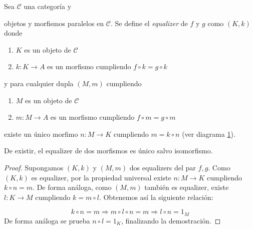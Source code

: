 \begin{definicion} [Equalizer]
    Sea $\mathscr{C}$ una categoría y  objetos y morfismos paralelos en $\mathscr{C}$. Se define el \textit{equalizer} de $f$ y $g$ como $(K,k)$ donde
    \begin{enumerate}
        \item $K$ es un objeto de $\mathscr{C}$
        \item $k: K \longrightarrow A$ es un morfismo cumpliendo $f \circ k = g \circ k$
    \end{enumerate}
    y para cualquier dupla $(M,m)$ cumpliendo
    \begin{enumerate}
        \item $M$ es un objeto de $\mathscr{C}$
        \item $m: M \longrightarrow A$ es un morfismo cumpliendo $f \circ m = g \circ m$
    \end{enumerate}

    existe un único morfimo $n: M \longrightarrow K$ cumpliendo $m = k \circ n$ (ver diagrama \ref{diagrama:equalizer}).

    \begin{figure}[h!]
        \centering
        \label{diagrama:equalizer}
    \end{figure}

\end{definicion}

\begin{proposicion} \label{eq:equalizer-salvo-iso}
    De existir, el equalizer de dos morfismos es único salvo isomorfismo.
\end{proposicion}
\begin{proof}
    Supongamos $(K,k)$ y $(M,m)$ dos equalizers del par $f,g$. Como $(K,k)$ es equalizer, por la propiedad universal existe $n: M \longrightarrow K$ cumpliendo $k \circ n = m$. De forma análoga, como $(M, m)$ también es equalizer, existe $l: K \longrightarrow M$ cumpliendo $k = m \circ l$. Obtenemos así la siguiente relación:

    $$
        k \circ n = m \Rightarrow m \circ l \circ n = m \Rightarrow l \circ n = 1_{M}
    $$
    De forma análoga se prueba $n \circ l = 1_K$, finalizando la demostración.
\end{proof}


